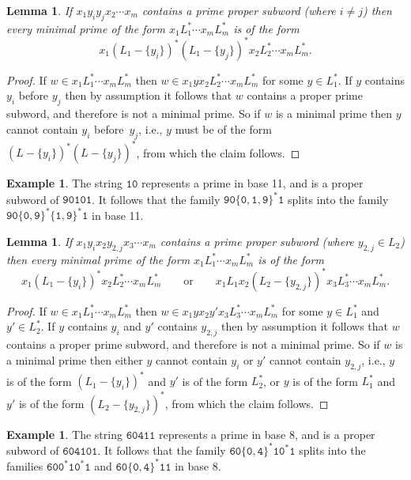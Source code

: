 \documentclass[12pt]{article}
\theoremstyle{plain}
\newtheorem{lemma}[theorem]{Lemma}
\theoremstyle{definition}
\newtheorem{example}[theorem]{Example}
\newcommand{\0}{\mathtt{0}}
\newcommand{\1}{\mathtt{1}}
\newcommand{\2}{\mathtt{2}}
\newcommand{\3}{\mathtt{3}}
\newcommand{\4}{\mathtt{4}}
\newcommand{\5}{\mathtt{5}}
\newcommand{\6}{\mathtt{6}}
\newcommand{\7}{\mathtt{7}}
\newcommand{\8}{\mathtt{8}}
\newcommand{\9}{\mathtt{9}}
\begin{document}
\begin{lemma}\label{lemsplit2b}
If $x_1y_iy_jx_2\dotsm x_m$ contains a prime proper subword (where $i\neq j$) then every minimal prime of the form
$x_1L_1^*\dotsm x_mL_m^*$ is of the form \[x_1(L_1-\{y_i\})^*(L_1-\{y_j\})^*x_2L_2^*\dotsm x_mL_m^* . \]
\end{lemma}
\begin{proof}
If $w\in x_1L_1^*\dotsm x_mL_m^*$ then $w\in x_1yx_2L_2^*\dotsm x_mL_m^*$ for some $y\in L_1^*$.
If $y$ contains $y_i$ before $y_j$ then by assumption it follows that $w$ contains a proper prime subword,
and therefore is not a minimal prime.  So if $w$ is a minimal prime then $y$ cannot contain $y_i$ before~$y_j$,
i.e., $y$ must be of the form $(L-\{y_i\})^*(L-\{y_j\})^*$, from which the claim follows.
\end{proof}
\begin{example}
The string $\1\0$ represents a prime in base 11, and is a proper subword of $\9\0\1\0\1$.
It follows that the family $\9\0\{\0,\1,\9\}^*\1$ splits into the family $\9\0\{\0,\9\}^*\{\1,\9\}^*\1$ in base 11.
\end{example}

\begin{lemma}\label{lemsplit2c}
If $x_1y_ix_2y_{2,j}x_3\dotsm x_m$ contains a prime proper subword (where $y_{2,j}\in L_2$) then every minimal prime of the form
$x_1L_1^*\dotsm x_mL_m^*$ is of the form
\[x_1(L_1-\{y_i\})^*x_2L_2^*\dotsm x_mL_m^* \qquad\text{or}\qquad x_1L_1x_2(L_2-\{y_{2,j}\})^*x_3L_3^*\dotsm x_mL_m^* . \]
\end{lemma}
\begin{proof}
If $w\in x_1L_1^*\dotsm x_mL_m^*$ then $w\in x_1yx_2y'x_3L_3^*\dotsm x_mL_m^*$ for some $y\in L_1^*$ and $y'\in L_2^*$.
If $y$ contains $y_i$ and $y'$ contains $y_{2,j}$ then by assumption it follows that $w$ contains a proper prime subword,
and therefore is not a minimal prime.  So if $w$ is a minimal prime then either $y$ cannot contain $y_i$ or $y'$ cannot
contain $y_{2,j}$, i.e., $y$ is of the form $(L_1-\{y_i\})^*$ and $y'$ is of the form $L_2^*$, or $y$ is of the form
$L_1^*$ and $y'$ is of the form $(L_2-\{y_{2,j}\})^*$, from which the claim follows.
\end{proof}
\begin{example}
The string $\6\0\4\1\1$ represents a prime in base 8, and is a proper subword of $\6\0\4\1\0\1$.
It follows that the family $\6\0\{\0,\4\}^*\1\0^*\1$ splits into the families
$\6\0\0^*\1\0^*\1$ and $\6\0\{\0,\4\}^*\1\1$ in base 8.
\end{example}
\end{document}
